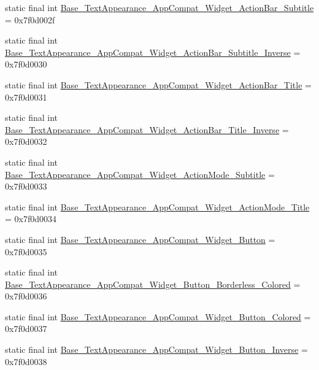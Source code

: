 \begin{DoxyCompactItemize}
\item 
static final int \mbox{\hyperlink{classandroid_1_1support_1_1design_1_1R_1_1style_af9dc756dbf9823a4e711f295a3ce6756}{Base\+\_\+\+Text\+Appearance\+\_\+\+App\+Compat\+\_\+\+Widget\+\_\+\+Action\+Bar\+\_\+\+Subtitle}} = 0x7f0d002f
\item 
static final int \mbox{\hyperlink{classandroid_1_1support_1_1design_1_1R_1_1style_afb0b9a877ffad2046b76360f7e097b50}{Base\+\_\+\+Text\+Appearance\+\_\+\+App\+Compat\+\_\+\+Widget\+\_\+\+Action\+Bar\+\_\+\+Subtitle\+\_\+\+Inverse}} = 0x7f0d0030
\item 
static final int \mbox{\hyperlink{classandroid_1_1support_1_1design_1_1R_1_1style_a86a9497cb9bcb3081388140593c9d85b}{Base\+\_\+\+Text\+Appearance\+\_\+\+App\+Compat\+\_\+\+Widget\+\_\+\+Action\+Bar\+\_\+\+Title}} = 0x7f0d0031
\item 
static final int \mbox{\hyperlink{classandroid_1_1support_1_1design_1_1R_1_1style_adbb28d8e89e3fb18c87e64d10b2a224e}{Base\+\_\+\+Text\+Appearance\+\_\+\+App\+Compat\+\_\+\+Widget\+\_\+\+Action\+Bar\+\_\+\+Title\+\_\+\+Inverse}} = 0x7f0d0032
\item 
static final int \mbox{\hyperlink{classandroid_1_1support_1_1design_1_1R_1_1style_a220c2b93853663f129a3a4fed0f413ac}{Base\+\_\+\+Text\+Appearance\+\_\+\+App\+Compat\+\_\+\+Widget\+\_\+\+Action\+Mode\+\_\+\+Subtitle}} = 0x7f0d0033
\item 
static final int \mbox{\hyperlink{classandroid_1_1support_1_1design_1_1R_1_1style_a2ac186a582133b18d51ae89caf3ea5db}{Base\+\_\+\+Text\+Appearance\+\_\+\+App\+Compat\+\_\+\+Widget\+\_\+\+Action\+Mode\+\_\+\+Title}} = 0x7f0d0034
\item 
static final int \mbox{\hyperlink{classandroid_1_1support_1_1design_1_1R_1_1style_ae167becff54797daa37aa8e81fc5d6c8}{Base\+\_\+\+Text\+Appearance\+\_\+\+App\+Compat\+\_\+\+Widget\+\_\+\+Button}} = 0x7f0d0035
\item 
static final int \mbox{\hyperlink{classandroid_1_1support_1_1design_1_1R_1_1style_a80226a53e4097429c183970d719b7384}{Base\+\_\+\+Text\+Appearance\+\_\+\+App\+Compat\+\_\+\+Widget\+\_\+\+Button\+\_\+\+Borderless\+\_\+\+Colored}} = 0x7f0d0036
\item 
static final int \mbox{\hyperlink{classandroid_1_1support_1_1design_1_1R_1_1style_a6a73ddf9c801684410a290954b07e9fa}{Base\+\_\+\+Text\+Appearance\+\_\+\+App\+Compat\+\_\+\+Widget\+\_\+\+Button\+\_\+\+Colored}} = 0x7f0d0037
\item 
static final int \mbox{\hyperlink{classandroid_1_1support_1_1design_1_1R_1_1style_a9b290b654323f5f57c9e29efda48226f}{Base\+\_\+\+Text\+Appearance\+\_\+\+App\+Compat\+\_\+\+Widget\+\_\+\+Button\+\_\+\+Inverse}} = 0x7f0d0038

\end{DoxyCompactItemize}
